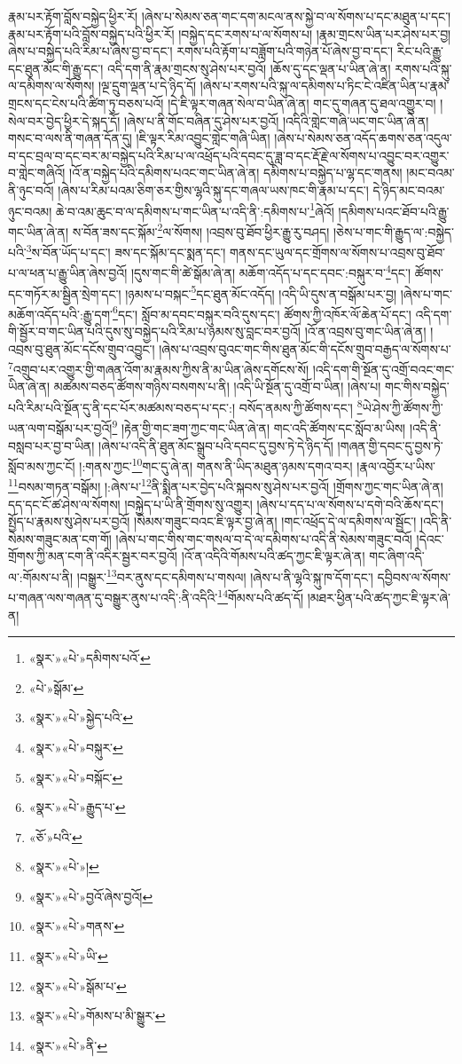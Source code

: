 རྣམ་པར་རྟོག་བློས་བསྐྱེད་ཕྱིར་རོ། །ཞེས་པ་སེམས་ཅན་གང་དག་མངལ་ནས་སྐྱེ་བ་ལ་སོགས་པ་དང་མཐུན་པ་དང་། རྣམ་པར་རྟོག་པའི་བློས་བསྐྱེད་པའི་ཕྱིར་རོ། །བསྐྱེད་དང་རགས་པ་ལ་སོགས་པ། །རྣམ་གྲངས་ཡིན་པར་ཤེས་པར་བྱ། ཞེས་པ་བསྐྱེད་པའི་རིམ་པ་ཞེས་བྱ་བ་དང་། རགས་པའི་རྟོག་པ་བཟློག་པའི་གཉེན་པོ་ཞེས་བྱ་བ་དང་། རིང་པའི་རྒྱུ་དང་ཐུན་མོང་གི་རྒྱུ་དང་། འདི་དག་ནི་རྣམ་གྲངས་སུ་ཤེས་པར་བྱའོ། །ཆོས་དུ་དང་ལྡན་པ་ཡིན་ཞེ་ན། རགས་པའི་སྐུ་ལ་དམིགས་ལ་སོགས། །ལྔ་དྲུག་ལྡན་པ་དེ་ཉིད་དོ། །ཞེས་པ་རགས་པའི་སྐུ་ལ་དམིགས་པ་ཏིང་ངེ་འཛིན་ཡིན་པ་རྣམ་གྲངས་དང་ངེས་པའི་ཚིག་ཏུ་བཅས་པའོ། །དེ་ཇི་ལྟར་གཞན་སེལ་བ་ཡིན་ཞེ་ན། གང་དུ་གཞན་དུ་ཐལ་འགྱུར་བ། །སེལ་བར་བྱེད་ཕྱིར་དེ་སྐད་དོ། །ཞེས་པ་ནི་གོང་བཞིན་དུ་ཤེས་པར་བྱའོ། །འདིའི་གླེང་གཞི་ཡང་གང་ཡིན་ཞེ་ན། གསང་བ་ལས་ནི་གཞན་དོན་དུ། །ཇི་ལྟར་རིམ་འབྱུང་གླེང་གཞི་ཡིན། །ཞེས་པ་སེམས་ཅན་འདོད་ཆགས་ཅན་འདུལ་བ་དང་བྲལ་བ་དང་བར་མ་བསྐྱེད་པའི་རིམ་པ་ལ་འཕྲོད་པའི་དབང་དུ་ཟླ་བ་དང་རྡོ་རྗེ་ལ་སོགས་པ་འབྱུང་བར་འགྱུར་བ་གླེང་གཞིའོ། །འོ་ན་བསྐྱེད་པའི་དམིགས་པའང་གང་ཡིན་ཞེ་ན། དམིགས་པ་བསྐྱེད་པ་ལྷ་དང་གནས། །མང་བའམ་ནི་ཉུང་བའོ། །ཞེས་པ་རིམ་པའམ་ཅིག་ཅར་གྱིས་ལྷའི་སྐུ་དང་གཞལ་ཡས་ཁང་གི་རྣམ་པ་དང་། དེ་ཉིད་མང་བའམ་ཉུང་བའམ། ཆེ་བ་འམ་ཆུང་བ་ལ་དམིགས་པ་གང་ཡིན་པ་འདི་ནི་:དམིགས་པ་\footnote{«སྣར་»«པེ་»དམིགས་པའོ་}ཞེའོ། །དམིགས་པའང་ཐོབ་པའི་རྒྱུ་གང་ཡིན་ཞེ་ན། ས་བོན་ཟས་དང་སྐོམ་\footnote{«པེ་»སྒོམ་}ལ་སོགས། །འབྲས་བུ་ཐོབ་ཕྱིར་རྒྱུ་རུ་བཤད། །ཅེས་པ་གང་གི་རྒྱུད་ལ་:བསྐྱེད་པའི་\footnote{«སྣར་»«པེ་»སྐྱེད་པའི་}ས་བོན་ཡོད་པ་དང་། ཟས་དང་སྐོམ་དང་སྨན་དང་། གནས་དང་ཡུལ་དང་གྲོགས་ལ་སོགས་པ་འབྲས་བུ་ཐོབ་པ་ལ་ཕན་པ་རྒྱུ་ཡིན་ཞེས་བྱའོ། །དུས་གང་གི་ཚེ་སྒོམ་ཞེ་ན། མཆོག་འདོད་པ་དང་དབང་:བསྐུར་བ་\footnote{«སྣར་»«པེ་»བསྐུར་}དང་། ཚོགས་དང་གཏོར་མ་སྦྱིན་སྲེག་དང་། །ཉམས་པ་བསྐང་\footnote{«སྣར་»«པེ་»བསྐོང་}དང་ཐུན་མོང་འདོད། །འདི་ཡི་དུས་ན་བསྒོམ་པར་བྱ། །ཞེས་པ་གང་མཆོག་འདོད་པའི་:རྒྱུ་དག་\footnote{«སྣར་»«པེ་»རྒྱུད་པ་}དང་། སློབ་མ་དབང་བསྐུར་བའི་དུས་དང་། ཚོགས་ཀྱི་འཁོར་ལོ་ཆེན་པོ་དང་། འདི་དག་གི་སྦྱོར་བ་གང་ཡིན་པའི་དུས་སུ་བསྐྱེད་པའི་རིམ་པ་ཉམས་སུ་བླང་བར་བྱའོ། །འོ་ན་འབྲས་བུ་གང་ཡིན་ཞེ་ན། །འབྲས་བུ་ཐུན་མོང་དངོས་གྲུབ་འབྱུང་། །ཞེས་པ་འབྲས་བུའང་གང་གིས་ཐུན་མོང་གི་དངོས་གྲུབ་བརྒྱད་ལ་སོགས་པ་\footnote{«ཅོ་»པའི་}འགྲུབ་པར་འགྱུར་གྱི་གཞན་འོག་མ་རྣམས་ཀྱིས་ནི་མ་ཡིན་ཞེས་དགོངས་སོ། །འདི་དག་གི་སྔོན་དུ་འགྲོ་བའང་གང་ཡིན་ཞེ་ན། མཚམས་བཅད་ཚོགས་གཉིས་བསགས་པ་ནི། །འདི་ཡི་སྔོན་དུ་འགྲོ་བ་ཡིན། །ཞེས་པ། གང་གིས་བསྐྱེད་པའི་རིམ་པའི་སྔོན་དུ་ནི་དང་པོར་མཚམས་བཅད་པ་དང་:། བསོད་ནམས་ཀྱི་ཚོགས་དང་། \footnote{«སྣར་»«པེ་»།  }ཡེ་ཤེས་ཀྱི་ཚོགས་ཀྱི་ཡན་ལག་བསྒོམ་པར་བྱའོ།\footnote{«སྣར་»«པེ་»བྱའོ་ཞེས་བྱའོ།} །རྟེན་གྱི་གང་ཟག་ཀྱང་གང་ཡིན་ཞེ་ན། གང་འདི་ཚོགས་དང་སློབ་མ་ཡིས། །འདི་ནི་བསླབ་པར་བྱ་བ་ཡིན། །ཞེས་པ་འདི་ནི་ཐུན་མོང་སྒྲུབ་པའི་དབང་དུ་བྱས་ཏེ་དེ་ཉིད་དོ། །གཞན་གྱི་དབང་དུ་བྱས་ཏེ་སློབ་མས་ཀྱང་ངོ། །:གནས་ཀྱང་\footnote{«སྣར་»«པེ་»གནས་}གང་དུ་ཞེ་ན། གནས་ནི་ཡིད་མཐུན་ཉམས་དགའ་བར། །རྣལ་འབྱོར་པ་ཡིས་\footnote{«སྣར་»«པེ་»ཡི་}བསམ་གཏན་བསྒོམ། །:ཞེས་པ་\footnote{«སྣར་»«པེ་»སྒོམ་པ་}ནི་སྨིན་པར་བྱེད་པའི་སྐབས་སུ་ཤེས་པར་བྱའོ། །གྲོགས་ཀྱང་གང་ཡིན་ཞེ་ན། དད་དང་ངོ་ཚ་ཤེས་ལ་སོགས། །བསྐྱེད་པ་ཡི་ནི་གྲོགས་སུ་འགྱུར། །ཞེས་པ་དད་པ་ལ་སོགས་པ་དགེ་བའི་ཆོས་དང་། སྤྱོད་པ་རྣམས་སུ་ཤེས་པར་བྱའོ། །སེམས་གཟུང་བའང་ཇི་ལྟར་བྱ་ཞེ་ན། །གང་འཕྲོད་དེ་ལ་དམིགས་ལ་སྦྱོང་། །འདི་ནི་སེམས་གཟུང་མན་ངག་གོ། །ཞེས་པ་གང་གིས་གང་གསལ་བ་དེ་ལ་དམིགས་པ་འདི་ནི་སེམས་གཟུང་བའོ། །དེའང་གྲོགས་ཀྱི་མན་ངག་ནི་འདིར་སྦྱར་བར་བྱའོ། །འོ་ན་འདིའི་གོམས་པའི་ཚད་ཀྱང་ཇི་ལྟར་ཞེ་ན། གང་ཞིག་འདི་ལ་:གོམས་པ་ནི། །བསྒྱུར་\footnote{«སྣར་»«པེ་»གོམས་པ་མི་སྒྱུར་}བར་ནུས་དང་དམིགས་པ་གསལ། །ཞེས་པ་ནི་ལྷའི་སྐུ་ཁ་དོག་དང་། དབྱིབས་ལ་སོགས་པ་གཞན་ལས་གཞན་དུ་བསྒྱུར་ནུས་པ་འདི་:ནི་འདིའི་\footnote{«སྣར་»«པེ་»ནི་}གོམས་པའི་ཚད་དོ། །མཐར་ཕྱིན་པའི་ཚད་ཀྱང་ཇི་ལྟར་ཞེ་ན། 